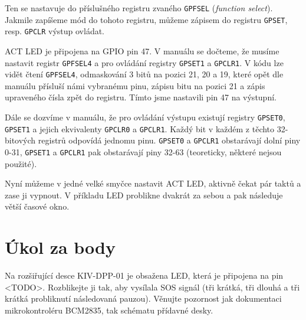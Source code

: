 \documentclass{article}
\begin{document}
Ten se nastavuje do příslušného registru zvaného \texttt{GPFSEL} (\emph{function select}). Jakmile zapíšeme mód do tohoto registru, můžeme zápisem do registru \texttt{GPSET}, resp. \texttt{GPCLR} výstup ovládat.

ACT LED je připojena na GPIO pin 47. V manuálu se dočteme, že musíme nastavit registr \texttt{GPFSEL4} a pro ovládání registry \texttt{GPSET1} a \texttt{GPCLR1}. V kódu lze vidět čtení \texttt{GPFSEL4}, odmaskování 3 bitů na pozici 21, 20 a 19, které opět dle manuálu přísluší námi vybranému pinu, zápisu bitu na pozici 21 a zápis upraveného čísla zpět do registru. Tímto jsme nastavili pin 47 na výstupní.

Dále se dozvíme v manuálu, že pro ovládání výstupu existují registry \texttt{GPSET0}, \texttt{GPSET1} a jejich ekvivalenty \texttt{GPCLR0} a \texttt{GPCLR1}. Každý bit v každém z těchto 32-bitových registrů odpovídá jednomu pinu. \texttt{GPSET0} a \texttt{GPCLR1} obstarávají dolní piny 0-31, \texttt{GPSET1} a \texttt{GPCLR1} pak obstarávají piny 32-63 (teoreticky, některé nejsou použité).

Nyní můžeme v jedné velké smyčce nastavit ACT LED, aktivně čekat pár taktů a zase ji vypnout. V příkladu LED problikne dvakrát za sebou a pak následuje větší časové okno.

\section{Úkol za body}

Na rozšiřující desce KIV-DPP-01 je obsažena LED, která je připojena na pin <TODO>. Rozblikejte ji tak, aby vysílala SOS signál (tři krátká, tři dlouhá a tři krátká probliknutí následovaná pauzou). Věnujte pozornost jak dokumentaci mikrokontroléru BCM2835, tak schématu přídavné desky.
\end{document}
